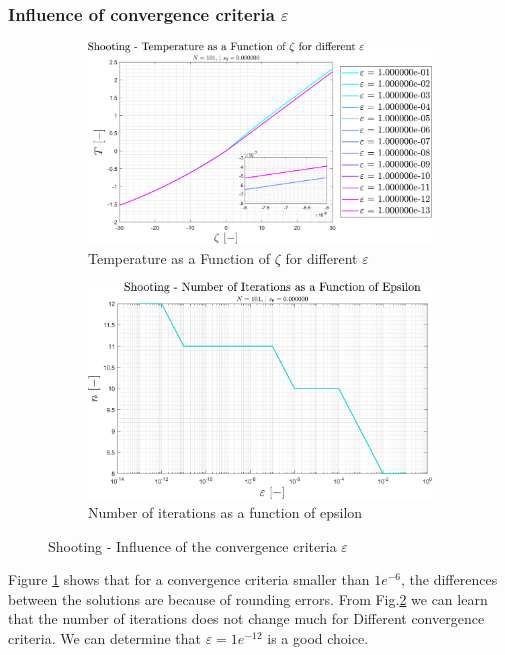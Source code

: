 \documentclass[11pt, a4paper]{article}
\begin{document}
\subsubsection{Influence of convergence criteria $\varepsilon$}
\begin{figure}[H]
    \centering
    \begin{subfigure}[c]{0.49\textwidth}
        \centering
        \includegraphics[width=\textwidth]{images/shooting - T vs zeta for diff epsilon.png}
        \caption{Temperature as a Function of $\zeta$ for different $\varepsilon$}
        \label{fig: shooting - T vs zeta for diff epsilon}
    \end{subfigure}
    \hfill
    \begin{subfigure}[c]{0.49\textwidth}
        \centering
        \includegraphics[width=\textwidth]{images/shooting - n vs epsilon.png}
        \caption{Number of iterations as a function of epsilon}
        \label{fig: shooting - n vs epsilon}
    \end{subfigure}
    \caption{Shooting - Influence of the convergence criteria $\varepsilon$}
    \label{fig: shooting - Influence of epsilon}
\end{figure}
Figure \ref{fig: shooting - T vs zeta for diff epsilon} shows that for a convergence criteria smaller than $1e^{-6}$, the differences between the solutions are because of rounding errors. From Fig.\ref{fig: shooting - n vs epsilon} we can learn that the number of iterations does not change much for Different convergence criteria. We can determine that $\varepsilon=1e^{-12}$ is a good choice.
\end{document}
